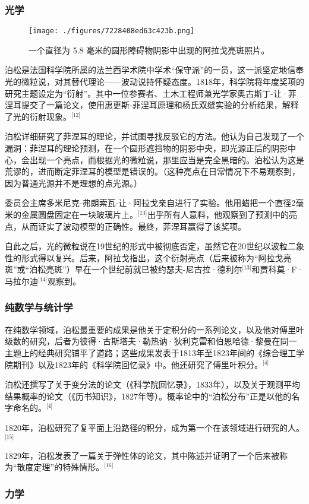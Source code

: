 \subsubsection{光学}
\begin{figure}[ht]
\centering
\texttt{[image: ./figures/7228408ed63c423b.png]}
\caption{一个直径为 5.8 毫米的圆形障碍物阴影中出现的阿拉戈亮斑照片。} \label{fig_BSDN_3}
\end{figure}
泊松是法国科学院所属的法兰西学术院中学术“保守派”的一员，这一派坚定地信奉光的微粒说，对其替代理论——波动说持怀疑态度。1818年，科学院将年度奖项的研究主题设定为“衍射”。其中一位参赛者、土木工程师兼光学家奥古斯丁-让·菲涅耳提交了一篇论文，使用惠更斯-菲涅耳原理和杨氏双缝实验的分析结果，解释了光的衍射现象。\(^\text{[12]}\)

泊松详细研究了菲涅耳的理论，并试图寻找反驳它的方法。他认为自己发现了一个漏洞：菲涅耳的理论预测，在一个圆形遮挡物的阴影中央，即光源正后的阴影中心，会出现一个亮点，而根据光的微粒说，那里应当是完全黑暗的。泊松认为这是荒谬的，进而断定菲涅耳的模型是错误的。（这种亮点在日常情况下不易观察到，因为普通光源并不是理想的点光源。）

委员会主席多米尼克-弗朗索瓦-让·阿拉戈亲自进行了实验。他用蜡把一个直径2毫米的金属圆盘固定在一块玻璃片上。\(^\text{[13]}\)出乎所有人意料，他观察到了预测中的亮点，从而证实了波动模型的正确性。最终，菲涅耳赢得了该奖项。

自此之后，光的微粒说在19世纪的形式中被彻底否定，虽然它在20世纪以波粒二象性的形式得以复兴。后来，阿拉戈指出，这个衍射亮点（后来被称为“阿拉戈亮斑”或“泊松亮斑”）早在一个世纪前就已被约瑟夫-尼古拉·德利尔\(^\text{[13]}\)和贾科莫·F·马拉尔迪\(^\text{[14]}\)观察到。
\subsubsection{纯数学与统计学}
在纯数学领域，泊松最重要的成果是他关于定积分的一系列论文，以及他对傅里叶级数的研究，后者为彼得·古斯塔夫·勒热讷·狄利克雷和伯恩哈德·黎曼在同一主题上的经典研究铺平了道路；这些成果发表于1813年至1823年间的《综合理工学院期刊》以及1823年的《科学院回忆录》中。他还研究了傅里叶积分。\(^\text{[4]}\)

泊松还撰写了关于变分法的论文（《科学院回忆录》，1833年），以及关于观测平均结果概率的论文（《历书知识》，1827年等）。概率论中的“泊松分布”正是以他的名字命名的。\(^\text{[4]}\)

1820年，泊松研究了复平面上沿路径的积分，成为第一个在该领域进行研究的人。\(^\text{[15]}\)

1829年，泊松发表了一篇关于弹性体的论文，其中陈述并证明了一个后来被称为“散度定理”的特殊情形。\(^\text{[16]}\)
\subsubsection{力学}